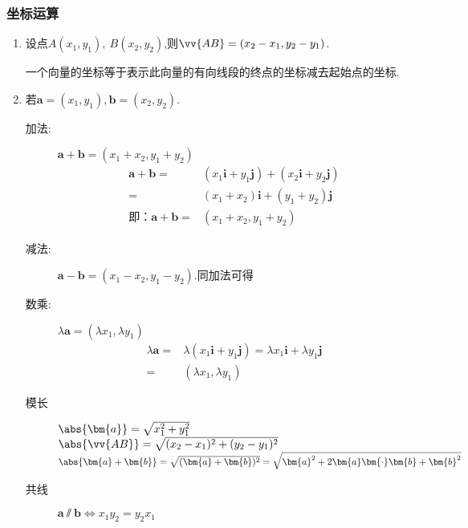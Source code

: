     \subsubsection{坐标运算}
      \begin{enumerate}
        \item
          设点$ A(x_1,y_1),~B(x_2,y_2) $,则$ \vv{AB}=(x_2-x_1,y_2-y_1) $.\par
          一个向量的坐标等于表示此向量的有向线段的终点的坐标减去起始点的坐标.
        \item
          若$\bm{a}=\left(x_1,y_1\right),\bm{b}=\left(x_2,y_2\right)$.
          \begin{description}
            \item[加法:]
              $\bm{a}+\bm{b}=(x_1+x_2,y_1+y_2)$
              \begin{equation*}
              \begin{aligned}
              \bm{a}+\bm{b}=&\left(x_1\bm{i}+y_1\bm{j}\right)+\left(x_2\bm{i}+y_2\bm{j}\right)\\
              =&\left(x_1+x_2\right)\bm{i}+\left(y_1+y_2\right)\bm{j}\\
              \text{即：}\bm{a}+\bm{b}=&(x_1+x_2,y_1+y_2)
              \end{aligned}
              \end{equation*}
            \item[减法:] $\bm{a}-\bm{b}=\left(x_1-x_2,y_1-y_2\right)$.同加法可得
            \item[数乘:]
              $ \lambda \bm{a}=\left(\lambda x_1,\lambda y_1\right) $\begin{equation*}
              \begin{aligned}
               \lambda \bm{a} =&\lambda\left(x_1\bm{i}+y_1\bm{j}\right)=\lambda x_1\bm{i}+\lambda y_1\bm{j}\\
              =&\left(\lambda x_1,\lambda y_1\right)
              \end{aligned}
              \end{equation*}
            \item[模长]
             $\abs{\bm{a}}=\sqrt{x_1^2+y_1^2}$\qquad
             $\abs{\vv{AB}}=\sqrt{(x_2-x_1)^2+(y_2-y_1)^2}$\\
             \qquad $\abs{\bm{a}+\bm{b}}=\sqrt{(\bm{a}+\bm{b})^2}=\sqrt{\bm{a}^2+2\bm{a}\bm{\cdot}\bm{b}+\bm{b}^2}$\\
            \item[共线]$\bm{a} \varparallel \bm{b}\Leftrightarrow x_1y_2=y_2x_1 $\\

\end{description}
\end{enumerate}
